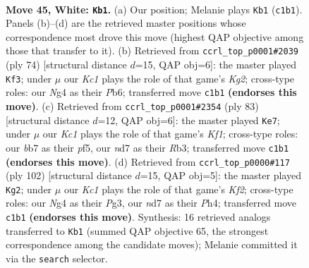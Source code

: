 \documentclass[11pt]{article}
\begin{document}
\clearpage

\begin{figure}[p]\centering
\begin{subfigure}{0.46\textwidth}\centering
\resizebox{\linewidth}{!}{%
\newchessgame
\chessboard[
  setfen={7k/1b1n4/8/8/p2p2N1/P5P1/1PP5/2K5 w - - 8 45},
  showmover=false,
  pgfstyle=straightmove, color=movearrow, markmove={c1-b1}
]}
\caption{}
\end{subfigure}\hfill
\begin{subfigure}{0.46\textwidth}\centering
\resizebox{\linewidth}{!}{%
\newchessgame
\chessboard[
  setfen={3n2k1/8/1P4p1/7p/7P/6P1/5PK1/8 w - - 1 38},
  showmover=false,
  pgfstyle=straightmove, color=movearrow, markmove={g2-f3}
]}
\caption{}
\end{subfigure}
\\[4pt]
\begin{subfigure}{0.46\textwidth}\centering
\resizebox{\linewidth}{!}{%
\newchessgame
\chessboard[
  setfen={5k2/5pp1/7p/3pPP2/6P1/1r6/5K2/R7 b - - 1 42},
  showmover=false,
  pgfstyle=straightmove, color=movearrow, markmove={f8-e7}
]}
\caption{}
\end{subfigure}\hfill
\begin{subfigure}{0.46\textwidth}\centering
\resizebox{\linewidth}{!}{%
\newchessgame
\chessboard[
  setfen={8/p7/3k4/1p3p1p/1P5P/P3P1P1/5K2/8 w - - 20 52},
  showmover=false,
  pgfstyle=straightmove, color=movearrow, markmove={f2-g2}
]}
\caption{}
\end{subfigure}
\caption{\textbf{Move 45, White: \texttt{Kb1}.} (a) Our position; Melanie plays \texttt{Kb1} (\texttt{c1b1}). Panels (b)--(d) are the retrieved master positions whose correspondence most drove this move (highest QAP objective among those that transfer to it). (b) Retrieved from \texttt{ccrl\_top\_p0001\#2039} (ply 74) [structural distance $d$=15, QAP obj=6]: the master played \texttt{Kf3}; under $\mu$ our \emph{Kc1} plays the role of that game's \emph{Kg2}; cross-type roles: our \emph{N}g4 as their \emph{P}b6; transferred move \texttt{c1b1} \textbf{(endorses this move)}. (c) Retrieved from \texttt{ccrl\_top\_p0001\#2354} (ply 83) [structural distance $d$=12, QAP obj=6]: the master played \texttt{Ke7}; under $\mu$ our \emph{Kc1} plays the role of that game's \emph{Kf1}; cross-type roles: our \emph{b}b7 as their \emph{p}f5, our \emph{n}d7 as their \emph{R}b3; transferred move \texttt{c1b1} \textbf{(endorses this move)}. (d) Retrieved from \texttt{ccrl\_top\_p0000\#117} (ply 102) [structural distance $d$=15, QAP obj=5]: the master played \texttt{Kg2}; under $\mu$ our \emph{Kc1} plays the role of that game's \emph{Kf2}; cross-type roles: our \emph{N}g4 as their \emph{P}g3, our \emph{n}d7 as their \emph{P}h4; transferred move \texttt{c1b1} \textbf{(endorses this move)}. Synthesis: 16 retrieved analogs transferred to \texttt{Kb1} (summed QAP objective 65, the strongest correspondence among the candidate moves); Melanie committed it via the \texttt{search} selector.}
\label{fig:thought-m88}
\end{figure}
\end{document}
